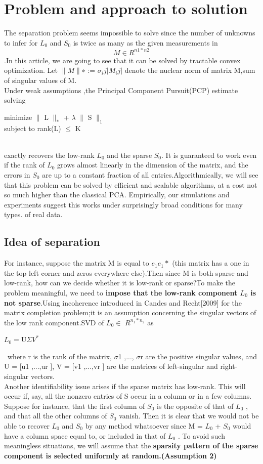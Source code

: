 \documentclass[letterpaper, 10 pt, conference]{ieeeconf}  %
\begin{document}
\section{Problem and approach to solution}

The separation problem seems impossible to solve since the number
of unknowns to infer for $L_0$ and $S_0$ is twice as many as the given measurements in \[M\in R^{n1*n2} \].In this article, we are going to see that it can be solved by tractable convex optimization. Let $\parallel M \parallel$∗ := $\sigma_ij|M_ij|$  denote the nuclear norm of matrix M,sum of singular values of M.
\\Under weak assumptions ,the Principal Component Pursuit(PCP) estimate solving
\begin{center}
minimize $\parallel$ L $\parallel_*$ + $\lambda$ $\parallel$ S $\parallel_1$
\\subject to rank(L) $\leq$ K
\end{center}\
\\exactly recovers the low-rank $L_0$ and the sparse $S_0$. 
It is guaranteed to work even if the rank of $L_0$ grows almost linearly in the dimension of the matrix, and the errors in $S_0$ are up to a constant fraction of all entries.Algorithmically, we
will see that this problem can be solved by efficient and scalable algorithms, at a cost not so much higher than the classical PCA. Empirically, our simulations and experiments suggest this works under surprisingly broad conditions for many types.
of real data.
\subsection{Idea of separation}
For instance, suppose the matrix M is equal to $e_1e_1*$
(this matrix has a one in the top left corner and zeros everywhere else).Then since M is both sparse and low-rank, how can we decide whether it is low-rank or sparse?To make the problem meaningful, we need to \textbf{impose that the low-rank component $L_0$ is not sparse}.Using incoherence introduced in Candes and Recht[2009] for the matrix completion problem;it is an assumption concerning the singular vectors of the low rank component.SVD of $L_0 \in $ $R^{n_1*n_2}$ as
\begin{center}
	$ L_0 = $U$\Sigma$$V^{*}$ 
\end{center}\ 
where r is the rank of the matrix, $\sigma$1 ,..., $\sigma$r are the positive singular values, and U = [u1 ,...,ur ], V = [v1 ,...,vr ] are the matrices of left-singular and right-singular vectors.
\\Another identifiability issue arises if the sparse matrix has low-rank. This will occur if, say, all the nonzero entries of S occur in a column or in a few columns. Suppose for instance, that the first column of $S_0$ is the opposite of that of $L_0$ , and that all the other columns of $S_0$  vanish. Then it is clear that we would not be able to recover $L_0$ and $S_0$
by any method whatsoever since M = $L_0$ + $S_0$ would have a column space equal to, or included in that of $L_0$ . To avoid such meaningless situations, we will assume that the\textbf{ sparsity pattern of the sparse component is selected uniformly at random.(Assumption 2)}
\end{document}
